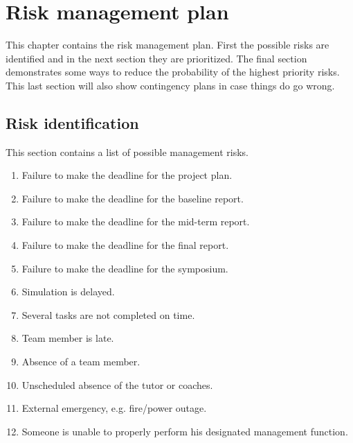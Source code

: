 \section{Risk management plan}
\label{dsePPRiskMP}
This chapter contains the risk management plan. First the possible risks are identified and in the next section they are prioritized. The final section demonstrates some ways to reduce the probability of the highest priority risks. This last section will also show contingency plans in case things do go wrong.
\subsection{Risk identification}
This section contains a list of possible management risks.
\begin{enumerate}
	\item Failure to make the deadline for the project plan.
	\item Failure to make the deadline for the baseline report.
	\item Failure to make the deadline for the mid-term report.
	\item Failure to make the deadline for the final report.
	\item Failure to make the deadline for the symposium.
	\item Simulation is delayed.
	\item Several tasks are not completed on time.
	\item Team member is late.
	\item Absence of a team member.
	\item Unscheduled absence of the tutor or coaches.
	\item External emergency, e.g. fire/power outage.
	\item Someone is unable to properly perform his designated management function.
\end{enumerate}
